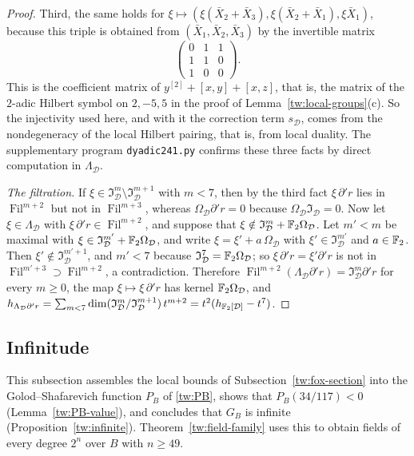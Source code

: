 \begin{proof}
Third, the same holds for $\xi\mapsto(\xi(\bar X_2+\bar X_3),\xi(\bar X_2+\bar X_1),\xi\bar X_1)$, because this
triple is obtained from $(\bar X_1,\bar X_2,\bar X_3)$ by the invertible matrix
\[
 \begin{pmatrix}0&1&1\\1&1&0\\1&0&0\end{pmatrix}.
\]
This is the coefficient matrix of $y^{[2]}+[x,y]+[x,z]$, that is, the matrix
of the $2$-adic Hilbert symbol on $2,-5,5$ in the proof of
Lemma~\ref{tw:local-groups}(c). So the injectivity used here, and with it
the correction term $s_{\mathcal D}$, comes from the nondegeneracy of the local Hilbert pairing,
that is, from local duality. The supplementary program \texttt{dyadic241.py}
confirms these three facts by direct computation in $\Lambda_{\mathcal D}$.

\emph{The filtration.} If $\xi\in\mathfrak I_{\mathcal D}^m\setminus\mathfrak I_{\mathcal D}^{m+1}$
with $m<7$, then by the third fact $\xi\,\partial'r$ lies in $\operatorname{Fil}^{m+2}$ but not
in $\operatorname{Fil}^{m+3}$, whereas $\Omega_{\mathcal D}\partial'r=0$ because $\Omega_{\mathcal D}\mathfrak I_{\mathcal D}=0$.
Now let $\xi\in\Lambda_{\mathcal D}$ with $\xi\,\partial'r\in \operatorname{Fil}^{m+2}$, and suppose that
$\xi\notin\mathfrak I_{\mathcal D}^m+\mathbb F_2\Omega_{\mathcal D}$. Let $m'<m$ be maximal with
$\xi\in\mathfrak I_{\mathcal D}^{m'}+\mathbb F_2\Omega_{\mathcal D}$, and write $\xi=\xi'+a\,\Omega_{\mathcal D}$
with $\xi'\in\mathfrak I_{\mathcal D}^{m'}$ and $a\in\mathbb F_2$. Then
$\xi'\notin\mathfrak I_{\mathcal D}^{m'+1}$, and $m'<7$ because
$\mathfrak I_{\mathcal D}^7=\mathbb F_2\Omega_{\mathcal D}$; so $\xi\,\partial'r=\xi'\partial'r$ is not in
$\operatorname{Fil}^{m'+3}\supset \operatorname{Fil}^{m+2}$, a contradiction. Therefore
$\operatorname{Fil}^{m+2}(\Lambda_{\mathcal D}\partial'r)=\mathfrak I_{\mathcal D}^m\partial'r$ for every $m\ge0$,
the map $\xi\mapsto\xi\,\partial'r$ has kernel $\mathbb F_2\Omega_{\mathcal D}$, and
$h_{\Lambda_{\mathcal D}\partial'r}=\sum_{m<7}\dim(\mathfrak I_{\mathcal D}^m/\mathfrak I_{\mathcal D}^{m+1})\,t^{m+2}=t^2(h_{\mathbb F_2[\mathcal D]}-t^7)$.
\end{proof}

\subsection{Infinitude}\label{tw:infinite-section}
This subsection assembles the local bounds of
Subsection~\ref{tw:fox-section} into the Golod--Shafarevich function $P_B$
of \eqref{tw:PB}, shows that $P_B(34/117)<0$ (Lemma~\ref{tw:PB-value}), and
concludes that $G_B$ is infinite (Proposition~\ref{tw:infinite}). Theorem~\ref{tw:field-family}
uses this to obtain fields of every degree $2^n$ over $B$ with $n\ge49$.

